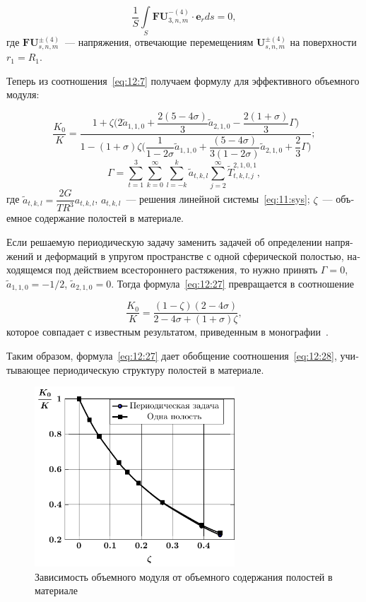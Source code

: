 \begin{russian}
\begin{equation}
\frac{1}{S}\int\limits_S \mathbf{FU}_{3,n,m}^{-(4)}\cdot\mathbf{e}_r ds=0,
\label{eq:12:26}
\end{equation}
где $\mathbf{FU}_{s,n,m}^{\pm(4)}$~--- напряжения, отвечающие перемещениям $\mathbf{U}_{s,n,m}^{\pm(4)}$ на поверхности $r_1=R_1$.

Теперь из соотношения~\eqref{eq:12:7} получаем формулу для эффективного объемного модуля:

\begin{equation}
\frac{K_0}{K}=\frac{1+\zeta\bigg(2 \tilde a_{1,1,0}+\dfrac{2(5-4\sigma)}{3} \tilde a_{2,1,0}-\dfrac{2(1+\sigma)}{3}\Gamma\bigg)}{1-(1+\sigma)\zeta\bigg(\dfrac{1}{1-2\sigma} \tilde a_{1,1,0}+\dfrac{(5-4\sigma)}{3(1-2\sigma)} \tilde a_{2,1,0}+\dfrac{2}{3}\Gamma\bigg)};
\label{eq:12:27}
\end{equation}
$$
\Gamma=\sum\limits_{t=1}^3\sum\limits_{k=0}^\infty\sum\limits_{l=-k}^k \tilde a_{t,k,l}\sum\limits_{j=2}^\infty\tilde T_{t,k,l,j}^{2,1,0,1},
$$
где $\tilde a_{t,k,l}=\dfrac{2G}{TR^3}a_{t,k,l}$, $a_{t,k,l}$~--- решения линейной системы~\eqref{eq:11:sys}; $\zeta$~--- объемное содержание полостей в материале.

Если решаемую периодическую задачу заменить задачей об определении напряжений и деформаций в упругом пространстве с одной сферической полостью, находящемся под действием всестороннего растяжения, то нужно принять $\Gamma=0$, $\tilde a_{1,1,0}=-1/2$, $\tilde a_{2,1,0}=0$. Тогда формула~\eqref{eq:12:27} превращается в соотношение

\begin{equation}
\frac{K_0}{K}=\frac{(1-\zeta)(2-4\sigma)}{2-4\sigma+(1+\sigma)\zeta},
\label{eq:12:28}
\end{equation}  
которое совпадает с известным результатом, приведенным в монографии~\cite{Vanin1985}.

Таким образом, формула~\eqref{eq:12:27} дает обобщение соотношения~\eqref{eq:12:28}, учитывающее периодическую структуру полостей в материале.

\begin{figure}[h!]
\centering
\includegraphics[width=7.5cm]{porous-spheres-k.pdf}
\caption{Зависимость объемного модуля от объемного содержания полостей в материале}
\label{f:12:2}
\end{figure}


\end{russian}

